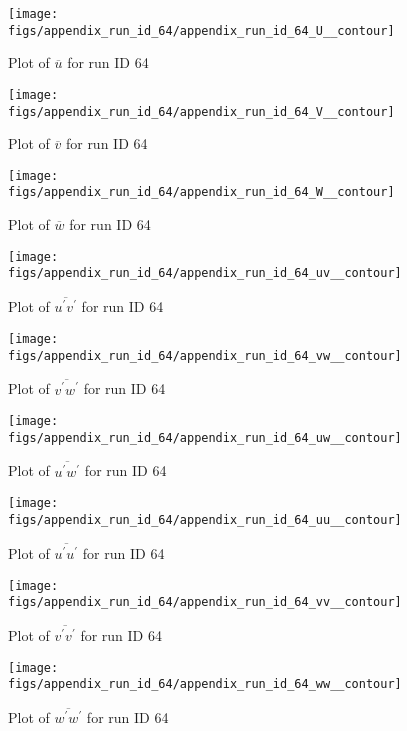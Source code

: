 \begin{figure}[H]
\centering
\texttt{[image: figs/appendix\_run\_id\_64/appendix\_run\_id\_64\_U\_\_contour]}
\caption{Plot of $\overline{u}$ for run ID 64}
\label{fig:appendix_run_id_64_U__contour}
\end{figure}


\begin{figure}[H]
\centering
\texttt{[image: figs/appendix\_run\_id\_64/appendix\_run\_id\_64\_V\_\_contour]}
\caption{Plot of $\overline{v}$ for run ID 64}
\label{fig:appendix_run_id_64_V__contour}
\end{figure}


\begin{figure}[H]
\centering
\texttt{[image: figs/appendix\_run\_id\_64/appendix\_run\_id\_64\_W\_\_contour]}
\caption{Plot of $\overline{w}$ for run ID 64}
\label{fig:appendix_run_id_64_W__contour}
\end{figure}


\begin{figure}[H]
\centering
\texttt{[image: figs/appendix\_run\_id\_64/appendix\_run\_id\_64\_uv\_\_contour]}
\caption{Plot of $\overline{u^\prime v^\prime}$ for run ID 64}
\label{fig:appendix_run_id_64_uv__contour}
\end{figure}


\begin{figure}[H]
\centering
\texttt{[image: figs/appendix\_run\_id\_64/appendix\_run\_id\_64\_vw\_\_contour]}
\caption{Plot of $\overline{v^\prime w^\prime}$ for run ID 64}
\label{fig:appendix_run_id_64_vw__contour}
\end{figure}


\begin{figure}[H]
\centering
\texttt{[image: figs/appendix\_run\_id\_64/appendix\_run\_id\_64\_uw\_\_contour]}
\caption{Plot of $\overline{u^\prime w^\prime}$ for run ID 64}
\label{fig:appendix_run_id_64_uw__contour}
\end{figure}


\begin{figure}[H]
\centering
\texttt{[image: figs/appendix\_run\_id\_64/appendix\_run\_id\_64\_uu\_\_contour]}
\caption{Plot of $\overline{u^\prime u^\prime}$ for run ID 64}
\label{fig:appendix_run_id_64_uu__contour}
\end{figure}


\begin{figure}[H]
\centering
\texttt{[image: figs/appendix\_run\_id\_64/appendix\_run\_id\_64\_vv\_\_contour]}
\caption{Plot of $\overline{v^\prime v^\prime}$ for run ID 64}
\label{fig:appendix_run_id_64_vv__contour}
\end{figure}


\begin{figure}[H]
\centering
\texttt{[image: figs/appendix\_run\_id\_64/appendix\_run\_id\_64\_ww\_\_contour]}
\caption{Plot of $\overline{w^\prime w^\prime}$ for run ID 64}
\label{fig:appendix_run_id_64_ww__contour}
\end{figure}


